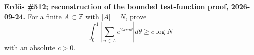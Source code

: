 \textbf{Erd\H{o}s \#512; reconstruction of the bounded test-function proof, 2026-09-24.}
For a finite $A\subset\mathbb Z$ with $|A|=N$, prove
\[
 \int_0^1\left|\sum_{n\in A}e^{2\pi in\theta}\right|d\theta\geq c\log N
\]
with an absolute $c>0$.
